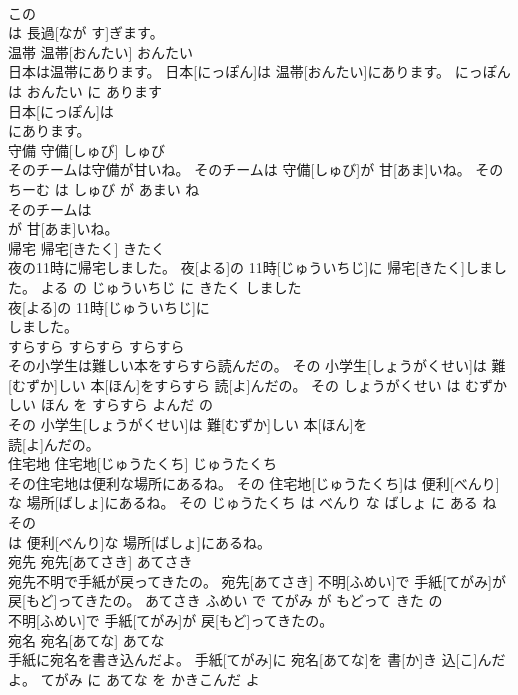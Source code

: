 \documentclass[8pt]{extreport}
\begin{document}
\begin{CJK}{UTF8}{min}
\\	この
\\	は 長過[なが す]ぎます。			
\\	温帯	温帯[おんたい]	おんたい	
\\	日本は温帯にあります。	日本[にっぽん]は 温帯[おんたい]にあります。	にっぽん は おんたい に あります	
\\	日本[にっぽん]は
\\	にあります。			
\\	守備	守備[しゅび]	しゅび	
\\	そのチームは守備が甘いね。	そのチームは 守備[しゅび]が 甘[あま]いね。	その ちーむ は しゅび が あまい ね	
\\	そのチームは
\\	が 甘[あま]いね。			
\\	帰宅	帰宅[きたく]	きたく	
\\	夜の11時に帰宅しました。	夜[よる]の 11時[じゅういちじ]に 帰宅[きたく]しました。	よる の じゅういちじ に きたく しました	
\\	夜[よる]の 11時[じゅういちじ]に
\\	しました。			
\\	すらすら	すらすら	すらすら	
\\	その小学生は難しい本をすらすら読んだの。	その 小学生[しょうがくせい]は 難[むずか]しい 本[ほん]をすらすら 読[よ]んだの。	その しょうがくせい は むずかしい ほん を すらすら よんだ の	
\\	その 小学生[しょうがくせい]は 難[むずか]しい 本[ほん]を
\\	読[よ]んだの。			
\\	住宅地	住宅地[じゅうたくち]	じゅうたくち	
\\	その住宅地は便利な場所にあるね。	その 住宅地[じゅうたくち]は 便利[べんり]な 場所[ばしょ]にあるね。	その じゅうたくち は べんり な ばしょ に ある ね	
\\	その
\\	は 便利[べんり]な 場所[ばしょ]にあるね。			
\\	宛先	宛先[あてさき]	あてさき	
\\	宛先不明で手紙が戻ってきたの。	宛先[あてさき] 不明[ふめい]で 手紙[てがみ]が 戻[もど]ってきたの。	あてさき ふめい で てがみ が もどって きた の	
\\	不明[ふめい]で 手紙[てがみ]が 戻[もど]ってきたの。			
\\	宛名	宛名[あてな]	あてな	
\\	手紙に宛名を書き込んだよ。	手紙[てがみ]に 宛名[あてな]を 書[か]き 込[こ]んだよ。	てがみ に あてな を かきこんだ よ	

\end{CJK}
\end{document}
